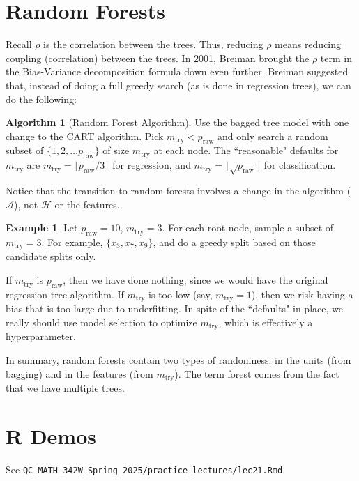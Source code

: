 \documentclass[12pt, a4paper]{article}
\theoremstyle{definition}
\newtheorem*{example}{Example}
\newtheorem{algorithm}{Algorithm}
\begin{document}
	\section*{Random Forests}
	Recall $\rho$ is the correlation between the trees. Thus, reducing $\rho$ means
	reducing coupling (correlation) between the trees. In 2001, Breiman brought the
	$\rho$ term in the Bias-Variance decomposition formula down even further. Breiman
	suggested that, instead of doing a full greedy search (as is done in regression trees),
	we can do the following:
	\begin{tcolorbox}
		\begin{algorithm}[Random Forest Algorithm]
			Use the bagged tree model with one change to the CART algorithm.
			Pick $m_{\text{try}} < p_{\text{raw}}$ and only search a random subset
			of $\{1,2,\ldots p_{\text{raw}}\}$ of size $m_{\text{try}}$ at each node.
			The ``reasonable" defaults for $m_{\text{try}}$ are
			$m_{\text{try}} = \lfloor p_{\text{raw}}/3\rfloor$ for regression,
			and $m_{\text{try}}=\lfloor \sqrt{p_{\text{raw}}}\rfloor$ for classification.
		\end{algorithm}
	\end{tcolorbox}
	Notice that the transition to random forests involves a change in the algorithm
	($\mathcal{A}$), not $\mathcal{H}$ or the features.
	\begin{tcolorbox}
		\begin{example}
			Let $p_{\text{raw}} = 10$, $m_{\text{try}} = 3$. For each root node,
			sample a subset of $m_{\text{try}} = 3$. For example, $\{x_3, x_7, x_9\}$,
			and do a greedy split based on those candidate splits only.
		\end{example}
	\end{tcolorbox}
	If $m_{\text{try}}$ is $p_{\text{raw}}$, then we have done nothing,
	since we would have the original regression tree algorithm. If $m_{\text{try}}$ is too
	low (say, $m_{\text{try}} = 1$), then we risk having a bias that is too large
	due to underfitting. In spite of the ``defaults" in place, we really should
	use model selection to optimize $m_{\text{try}}$, which is effectively a hyperparameter.
	
	In summary, random forests contain two types of randomness: in the units
	(from bagging) and in the features (from $m_{\text{try}}$). The term forest comes
	from the fact that we have multiple trees.
	\section*{R Demos}
	See \verb|QC_MATH_342W_Spring_2025/practice_lectures/lec21.Rmd|.
\end{document}
